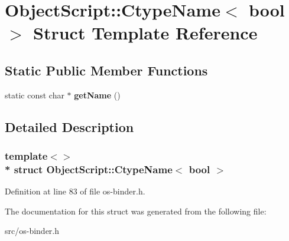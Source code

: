 \hypertarget{struct_object_script_1_1_ctype_name_3_01bool_01_4}{}\section{Object\+Script\+:\+:Ctype\+Name$<$ bool $>$ Struct Template Reference}
\label{struct_object_script_1_1_ctype_name_3_01bool_01_4}
\subsection*{Static Public Member Functions}
\begin{DoxyCompactItemize}
\item 
static const char $\ast$ {\bfseries get\+Name} ()\hypertarget{struct_object_script_1_1_ctype_name_3_01bool_01_4_af971ef41872a207ba8c0b01c10053855}{}\label{struct_object_script_1_1_ctype_name_3_01bool_01_4_af971ef41872a207ba8c0b01c10053855}

\end{DoxyCompactItemize}


\subsection{Detailed Description}
\subsubsection*{template$<$$>$\\*
struct Object\+Script\+::\+Ctype\+Name$<$ bool $>$}



Definition at line 83 of file os-\/binder.\+h.



The documentation for this struct was generated from the following file\+:\begin{DoxyCompactItemize}
\item 
src/os-\/binder.\+h\end{DoxyCompactItemize}
